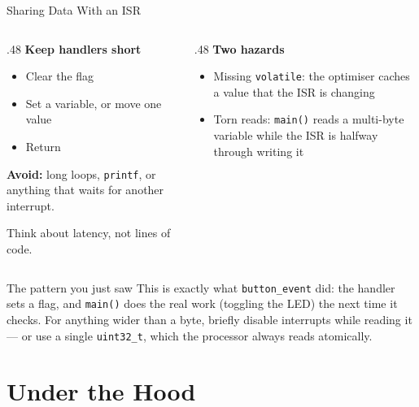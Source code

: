 \documentclass[9pt,aspectratio=169,xcolor=table]{beamer}
\begin{document}
\begin{frame}{Sharing Data With an ISR}
    \begin{columns}[T]
    \begin{column}{.48\textwidth}
        \textbf{Keep handlers short}
        {\small
        \begin{itemize}\itemsep1pt
            \item Clear the flag
            \item Set a variable, or move one value
            \item Return
        \end{itemize}}

        \vspace{2mm}
        {\small \textbf{Avoid:} long loops, \texttt{printf}, or anything
        that waits for another interrupt.}

        \vspace{2mm}
		{\small Think about latency, not lines of code.}
    \end{column}
    \begin{column}{.48\textwidth}
        \textbf{Two hazards}
        {\small
        \begin{itemize}\itemsep1pt
            \item \alert{Missing \texttt{volatile}}: the optimiser caches a
                  value that the ISR is changing
            \item \alert{Torn reads}: \texttt{main()} reads a multi-byte
                  variable while the ISR is halfway through writing it
        \end{itemize}}
    \end{column}
    \end{columns}

    \vspace{3mm}
    \begin{block}{The pattern you just saw}
        This is exactly what \texttt{button\_event} did: the handler sets
        a \alert{flag}, and \texttt{main()} does the real work (toggling
        the LED) the next time it checks. For anything wider than a byte,
        briefly disable interrupts while reading it --- or use a single
        \texttt{uint32\_t}, which the processor always reads atomically.
    \end{block}
\end{frame}

\section{Under the Hood}
\end{document}
